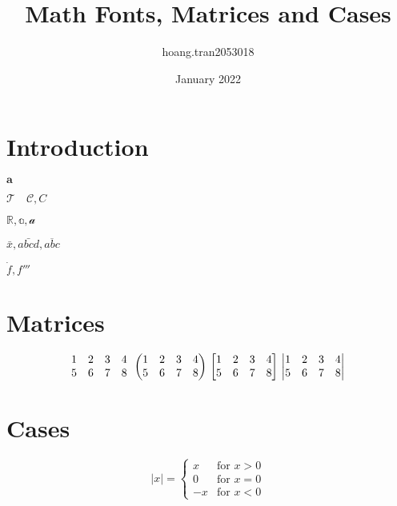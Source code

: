 \documentclass{article}
\title{Math Fonts, Matrices and Cases}
\author{hoang.tran2053018 }
\date{January 2022}
\begin{document}
\maketitle

\section{Introduction}
$\mathbf{a}$ %

$\mathcal{T} \quad \mathcal{C}, C$

$\mathbb{R}, \mathbb{a}, \mathcal{a}$

$\bar x, \bar {abcd}, \overline{abc}$

$\dot f, f'''$

\section{Matrices}
\[
\begin{matrix}
1 & 2 & 3 & 4\\
5 & 6 & 7 & 8
\end{matrix}\\
\begin{pmatrix}
1 & 2 & 3 & 4\\
5 & 6 & 7 & 8
\end{pmatrix}\\
\begin{bmatrix}
1 & 2 & 3 & 4\\
5 & 6 & 7 & 8
\end{bmatrix}\\
\begin{vmatrix}
1 & 2 & 3 & 4\\
5 & 6 & 7 & 8
\end{vmatrix}
\]

\section{Cases}
\[
|x| = 
\begin{cases}
x & \text{for } x>0\\
0 & \text{for } x=0\\
-x & \text{for } x<0
\end{cases}
\]
\end{document}
